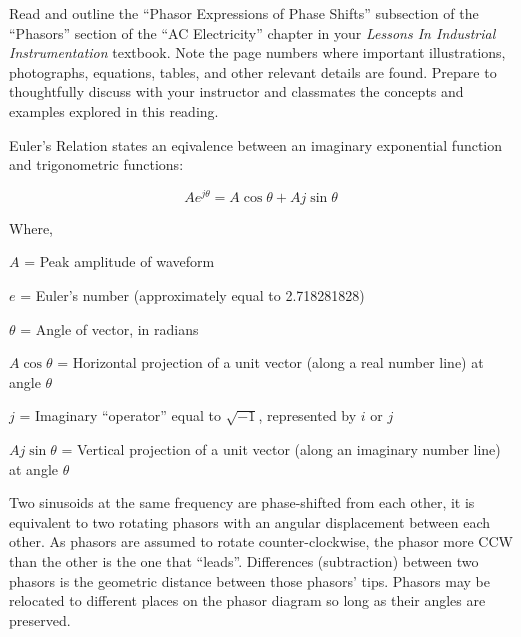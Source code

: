 

Read and outline the ``Phasor Expressions of Phase Shifts'' subsection of the ``Phasors'' section of the ``AC Electricity'' chapter in your {\it Lessons In Industrial Instrumentation} textbook.  Note the page numbers where important illustrations, photographs, equations, tables, and other relevant details are found.  Prepare to thoughtfully discuss with your instructor and classmates the concepts and examples explored in this reading.













Euler's Relation states an eqivalence between an imaginary exponential function and trigonometric functions:

$$Ae^{j \theta} = A \cos \theta + A j \sin \theta$$

\noindent
Where,

$A$ = Peak amplitude of waveform

$e$ = Euler's number (approximately equal to 2.718281828)

$\theta$ = Angle of vector, in radians

$A \cos \theta$ = Horizontal projection of a unit vector (along a real number line) at angle $\theta$

$j$ = Imaginary ``operator'' equal to $\sqrt{-1}$, represented by $i$ or $j$

$A j \sin \theta$ = Vertical projection of a unit vector (along an imaginary number line) at angle $\theta$

\vskip 10pt

Two sinusoids at the same frequency are phase-shifted from each other, it is equivalent to two rotating phasors with an angular displacement between each other.  As phasors are assumed to rotate counter-clockwise, the phasor more CCW than the other is the one that ``leads''.  Differences (subtraction) between two phasors is the geometric distance between those phasors' tips.  Phasors may be relocated to different places on the phasor diagram so long as their angles are preserved.

